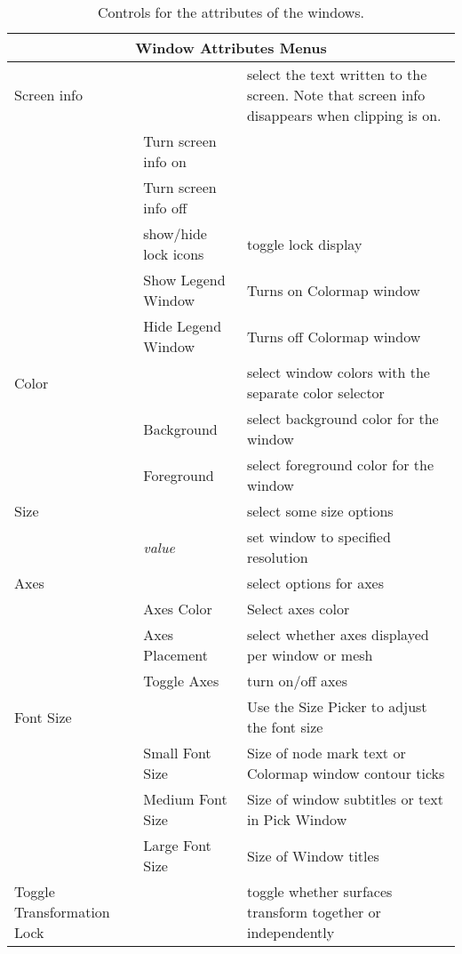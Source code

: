 \begin{table}[ht]
  \begin{center}
    \begin{tabular}{|l|l|p{3 in}|} \hline
      \multicolumn{3}{|c|}{\textbf{Window Attributes Menus}} \\ \hline
    Screen info & & select the text written to the screen.  Note that screen info 
       disappears when clipping is on.\\
      & Turn screen info on & \\
      & Turn screen info off & \\ 
      & show/hide lock icons & toggle lock display \\ \hline
      & Show Legend Window & Turns on Colormap window \\ 
      & Hide Legend Window & Turns off Colormap window \\ 
    Color & & select window colors with the separate color selector \\
      & Background & select background color for the window \\
      & Foreground & select foreground color for the window \\ \hline
    Size & & select some size options \\
      & \emph{value} & set window to specified resolution \\
    Axes & & select options for axes \\
      & Axes Color & Select axes color \\
      & Axes Placement & select whether axes displayed per window or mesh \\
      & Toggle Axes & turn on/off axes \\ \hline
    Font Size & & Use the Size Picker to adjust the font size \\
      & Small Font Size & Size of node mark text or Colormap window contour 
        ticks \\
      & Medium Font Size & Size of window subtitles or text in Pick Window \\
      & Large Font Size & Size of Window titles \\
    Toggle Transformation Lock & & toggle whether surfaces transform 
        together or independently \\ \hline
    \end{tabular}
  \end{center}
\caption{Controls for the attributes of the \map{} windows.}
\end{table}


